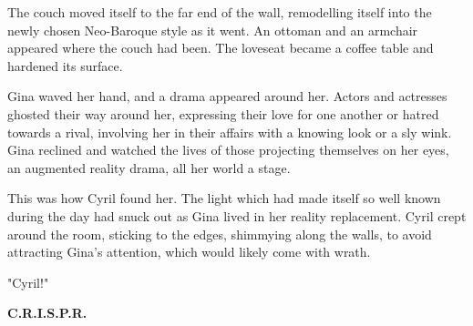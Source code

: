\documentclass[12pt]{article}
\begin{document}
The couch moved itself to the far end of the wall, remodelling itself into the newly chosen Neo-Baroque style as it went. An ottoman and an armchair appeared where the couch had been. The loveseat became a coffee table and hardened its surface.

Gina waved her hand, and a drama appeared around her. Actors and actresses ghosted their way around her, expressing their love for one another or hatred towards a rival, involving her in their affairs with a knowing look or a sly wink. Gina reclined and watched the lives of those projecting themselves on her eyes, an augmented reality drama, all her world a stage.

This was how Cyril found her. The light which had made itself so well known during the day had snuck out as Gina lived in her reality replacement. Cyril crept around the room, sticking to the edges, shimmying along the walls, to avoid attracting Gina's attention, which would likely come with wrath.

"Cyril!"



\textbf{C.R.I.S.P.R.}
\end{document}
